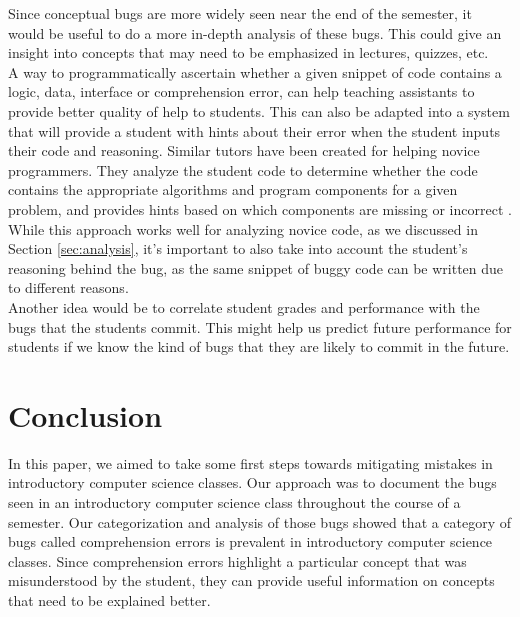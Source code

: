 \documentclass{sig-alternate}
\begin{document}
Since conceptual bugs are more widely seen near the end of the semester, it would be useful to do a more in-depth analysis of these bugs. This could give an insight into concepts that may need to be emphasized in lectures, quizzes, etc.\\

A way to programmatically ascertain whether a given snippet of code contains a logic, data, interface or comprehension error, can help teaching assistants to provide better quality of help to students. This can also be adapted into a system that will provide a student with hints about their error when the student inputs their code and reasoning. Similar tutors have been created for helping novice programmers. They analyze the student code to determine whether the code contains the appropriate algorithms and program components for a given problem, and provides hints based on which components are missing or incorrect \cite{Sudol-DeLyser14}. While this approach works well for analyzing novice code, as we discussed in Section \ref{sec:analysis}, it's important to also take into account the student's reasoning behind the bug, as the same snippet of buggy code can be written due to different reasons.\\

Another idea would be to correlate student grades and performance with the bugs that the students commit. This might help us predict future performance for students if we know the kind of bugs that they are likely to commit in the future.

\section{Conclusion}

In this paper, we aimed to take some first steps towards mitigating mistakes in introductory computer science classes. Our approach was to document the bugs seen in an introductory computer science class throughout the course of a semester. Our categorization and analysis of those bugs showed that a category of bugs called comprehension errors is prevalent in introductory computer science classes. Since comprehension errors highlight a particular concept that was misunderstood by the student, they can provide useful information on concepts that need to be explained better.\\



\balancecolumns
\end{document}
